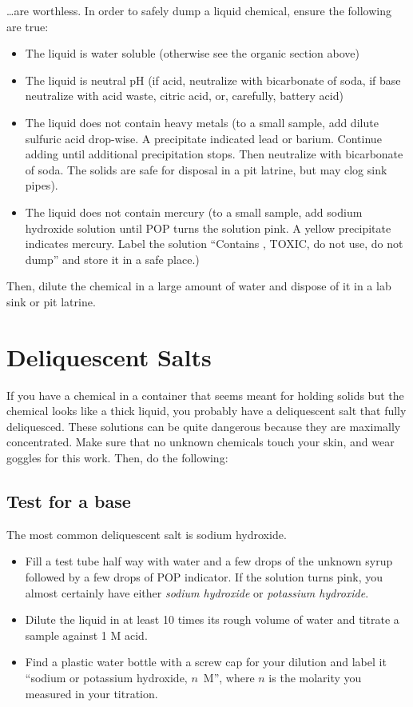 \ldots are worthless. 
In order to safely dump a liquid chemical, 
ensure the following are true:
\begin{itemize}
\item The liquid is water soluble (otherwise see the organic section above)
\item The liquid is neutral pH (if acid, 
neutralize with bicarbonate of soda, 
if base neutralize with acid waste, 
citric acid, 
or, 
carefully, 
battery acid)
\item The liquid does not contain heavy metals (to a small sample, 
add dilute sulfuric acid drop-wise. 
A precipitate indicated lead or barium. 
Continue adding until additional precipitation stops. 
Then neutralize with bicarbonate of soda. 
The solids are safe for disposal in a pit latrine, 
but may clog sink pipes).
\item The liquid does not contain mercury (to a small sample, 
add sodium hydroxide solution until POP turns the solution pink. 
A yellow precipitate indicates mercury. 
Label the solution ``Contains , 
TOXIC, 
do not use, 
do not dump'' and store it in a safe place.)
\end{itemize}
Then, 
dilute the chemical in a large amount of water 
and dispose of it in a lab sink or pit latrine.

\section{Deliquescent Salts}

If you have a chemical in a container that seems meant 
for holding solids but the chemical looks like a thick liquid, 
you probably have a deliquescent salt that fully deliquesced. 
These solutions can be quite dangerous 
because they are maximally concentrated. 
Make sure that no unknown chemicals touch your skin, 
and wear goggles for this work. 
Then, 
do the following:

\subsection{Test for a base}
The most common deliquescent salt is sodium hydroxide. 
\begin{itemize}
\item Fill a test tube half way with water 
and a few drops of the unknown syrup 
followed by a few drops of POP indicator. 
If the solution turns pink, 
you almost certainly have either 
\emph{sodium hydroxide} or \emph{potassium hydroxide}. 
\item Dilute the liquid in at least 10 times its 
rough volume of water and titrate a sample against 1 M acid. 
\item Find a plastic water bottle with a screw cap for your dilution and 
label it ``sodium or potassium hydroxide, 
$n$~M'', 
where $n$ is the molarity you measured in your titration.
\end{itemize}

